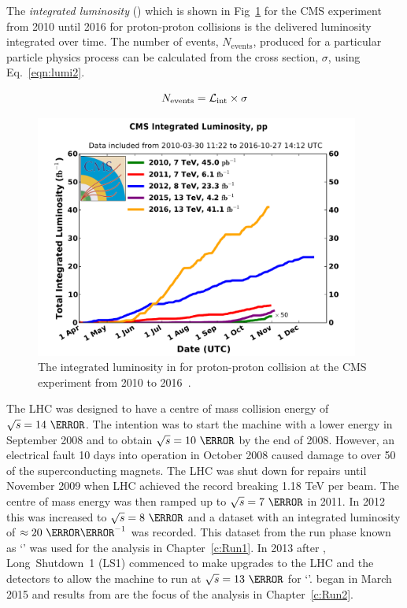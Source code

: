 The \emph{integrated luminosity} (\lumiint) which is shown in Fig~\ref{fig:Lumi} for the CMS experiment from 2010 until 2016 for proton-proton collisions is the delivered luminosity integrated over time. The number of events, $N_{\textrm{events}}$, produced for a particular particle physics process can be calculated from the cross section, $\sigma$, using Eq.~\ref{eqn:lumi2}.

\begin{equation}
N_{\textrm{events}} = \mathcal{L}_{\text{int}} \times \sigma
\label{eqn:lumi2}
\end{equation}

\begin{figure}[ht!]
\centering
    \includegraphics[width=0.95\textwidth]{images/int_lumi_cumulative_pp_2.pdf}
    \caption{The integrated luminosity in \fbinv for proton-proton collision at the CMS experiment from 2010 to 2016~\cite{lumiplotref}.}
    \label{fig:Lumi}
\end{figure}

The LHC was designed to have a centre of mass collision energy of $\sqrt{s} = 14~\TeV$. The intention was to start the machine with a lower energy in September 2008 and to obtain $\sqrt{s} = 10~\TeV$ by the end of 2008. However, an electrical fault 10 days into operation in October 2008 caused damage to over 50 of the superconducting magnets. The LHC was shut down for repairs until November 2009 when LHC achieved the record breaking 1.18 TeV per beam. The centre of mass energy was then ramped up to $\sqrt{s} = 7~\TeV$ in 2011. In 2012 this was increased to $\sqrt{s} = 8~\TeV$ and a dataset with an integrated luminosity of $\approx 20~\fbinv$ was recorded. This dataset from the run phase known as `\runone' was used for the analysis in Chapter~\ref{c:Run1}. In 2013 after \runone, Long~Shutdown~1 (LS1) commenced to make upgrades to the LHC and the detectors to allow the machine to run at $\sqrt{s} = 13~\TeV$ for `\runtwo'. \runtwo began in March 2015 and results from \runtwo are the focus of the analysis in Chapter~\ref{c:Run2}.

